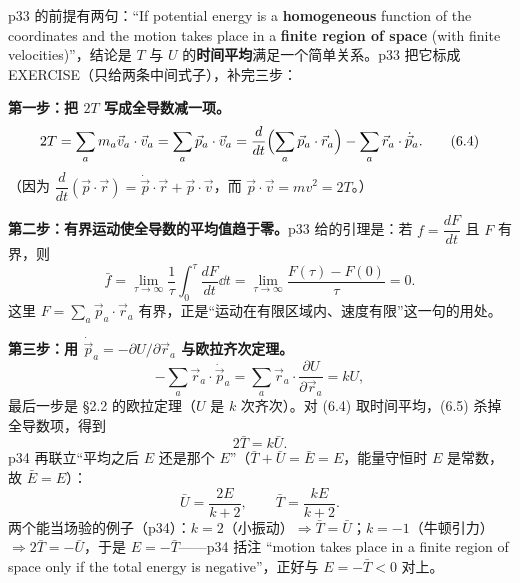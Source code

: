 \documentclass[11pt]{ctexart}
\begin{document}


p33 的前提有两句：“If potential energy is a \textbf{homogeneous} function of the coordinates and the motion takes place in a \textbf{finite region of space} (with finite velocities)”，结论是 $T$ 与 $U$ 的\textbf{时间平均}满足一个简单关系。p33 把它标成 EXERCISE（只给两条中间式子），补完三步：

\textbf{第一步：把 $2T$ 写成全导数减一项。}
\[
2T=\sum_am_a\vec v_a\cdot\vec v_a=\sum_a\vec p_a\cdot\vec v_a
=\frac{d}{dt}\Bigl(\sum_a\vec p_a\cdot\vec r_a\Bigr)-\sum_a\vec r_a\cdot\dot{\vec p}_a . \tag{6.4}
\]
（因为 $\dfrac{d}{dt}(\vec p\cdot\vec r)=\dot{\vec p}\cdot\vec r+\vec p\cdot\vec v$，而 $\vec p\cdot\vec v=mv^2=2T$。）

\textbf{第二步：有界运动使全导数的平均值趋于零。}p33 给的引理是：若 $f=\dfrac{dF}{dt}$ 且 $F$ 有界，则
\[
\bar f=\lim_{\tau\to\infty}\frac{1}{\tau}\int_0^{\tau}\frac{dF}{dt}\dd t=\lim_{\tau\to\infty}\frac{F(\tau)-F(0)}{\tau}=0 . \tag{6.5}
\]
这里 $F=\sum_a\vec p_a\cdot\vec r_a$ 有界，正是“运动在有限区域内、速度有限”这一句的用处。

\textbf{第三步：用 $\dot{\vec p}_a=-\partial U/\partial\vec r_a$ 与欧拉齐次定理。}
\[
-\sum_a\vec r_a\cdot\dot{\vec p}_a=\sum_a\vec r_a\cdot\frac{\partial U}{\partial\vec r_a}=kU ,
\]
最后一步是 §2.2 的欧拉定理（$U$ 是 $k$ 次齐次）。对 (6.4) 取时间平均，(6.5) 杀掉全导数项，得到
\[
2\bar T=k\bar U . \tag{6.6}
\]
p34 再联立“平均之后 $E$ 还是那个 $E$”（$\bar T+\bar U=\bar E=E$，能量守恒时 $E$ 是常数，故 $\bar E=E$）：
\[
\bar U=\frac{2E}{k+2},\qquad \bar T=\frac{kE}{k+2}. \tag{6.7}
\]
两个能当场验的例子（p34）：$k=2$（小振动）$\Rightarrow\bar T=\bar U$；$k=-1$（牛顿引力）$\Rightarrow 2\bar T=-\bar U$，于是 $E=-\bar T$——p34 括注 “motion takes place in a finite region of space only if the total energy is negative”，正好与 $E=-\bar T<0$ 对上。

\end{document}
